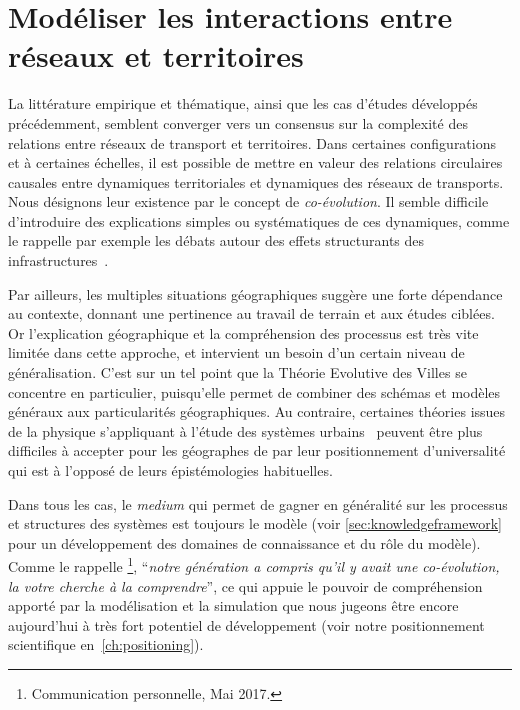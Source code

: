 

\chapter{Modéliser les interactions entre réseaux et territoires}


\label{ch:modelinginteractions}





La littérature empirique et thématique, ainsi que les cas d'études développés précédemment, semblent converger vers un consensus sur la complexité des relations entre réseaux de transport et territoires. Dans certaines configurations et à certaines échelles, il est possible de mettre en valeur des relations circulaires causales entre dynamiques territoriales et dynamiques des réseaux de transports. Nous désignons leur existence par le concept de \emph{co-évolution}. Il semble difficile d'introduire des explications simples ou systématiques de ces dynamiques, comme le rappelle par exemple les débats autour des effets structurants des infrastructures~\cite{offner1993effets}.


Par ailleurs, les multiples situations géographiques suggère une forte dépendance au contexte, donnant une pertinence au travail de terrain et aux études ciblées. Or l'explication géographique et la compréhension des processus est très vite limitée dans cette approche, et intervient un besoin d'un certain niveau de généralisation. C'est sur un tel point que la Théorie Evolutive des Villes se concentre en particulier, puisqu'elle permet de combiner des schémas et modèles généraux aux particularités géographiques. Au contraire, certaines théories issues de la physique s'appliquant à l'étude des systèmes urbains~\cite{west2017scale} peuvent être plus difficiles à accepter pour les géographes de par leur positionnement d'universalité qui est à l'opposé de leurs épistémologies habituelles.


Dans tous les cas, le \emph{medium} qui permet de gagner en généralité sur les processus et structures des systèmes est toujours le modèle (voir \ref{sec:knowledgeframework} pour un développement des domaines de connaissance et du rôle du modèle). Comme le rappelle \footnote{Communication personnelle, Mai 2017.}, ``\textit{notre génération a compris qu'il y avait une co-évolution, la votre cherche à la comprendre}'', ce qui appuie le pouvoir de compréhension apporté par la modélisation et la simulation que nous jugeons être encore aujourd'hui à très fort potentiel de développement (voir notre positionnement scientifique en~\ref{ch:positioning}).

